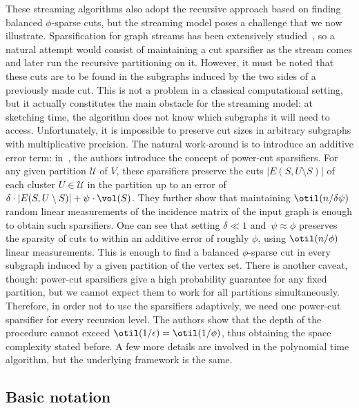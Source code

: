 These streaming algorithms also adopt the recursive approach based on finding balanced $\phi$-sparse cuts, but the streaming model poses a challenge that we now illustrate. Sparsification for graph streams has been extensively studied~\cite{ahnguha,linmeas,sparsdynamicstreams,focsspars,spectralspars}, so a natural attempt would consist of maintaining a cut sparsifier as the stream comes and later run the recursive partitioning on it. However, it must be noted that these cuts are to be found in the subgraphs induced by the two sides of a previously made cut. This is not a problem in a classical computational setting, but it actually constitutes the main obstacle for the streaming model: at sketching time, the algorithm does not know which subgraphs it will need to access. Unfortunately, it is impossible to preserve cut sizes in arbitrary subgraphs with multiplicative precision. The natural work-around is to introduce an additive error term: in~\cite{streamexpdec}, the authors introduce the concept of {power-cut} sparsifiers. For any given partition $\mathcal{U}$ of $V$, these sparsifiers preserve the cuts $|E(S,U\setminus S)|$ of each cluster $U \in \mathcal{U}$ in the partition up to an error of $\delta \cdot |E(S,U\setminus S)| + \psi \cdot \vol(S)$. They further show that maintaining $\otil(n / \delta \psi)$ random linear measurements of the incidence matrix of the input graph is enough to obtain such sparsifiers. One can see that setting $\delta \ll 1$ and~$\psi \approx \phi$ preserves the sparsity of cuts to within an additive error of roughly $\phi$, using $\otil(n/\phi)$ linear measurements. This is enough to find a balanced $\phi$-sparse cut in every subgraph induced by a given partition of the vertex set. There is another caveat, though: power-cut sparsifiers give a high probability guarantee for any fixed partition, but we cannot expect them to work for all partitions simultaneously. Therefore, in order not to use the sparsifiers adaptively, we need one power-cut sparsifier for every recursion level. The authors show that the depth of the procedure cannot exceed $\otil(1/\epsilon) = \otil(1/\phi)$, thus obtaining the space complexity stated before. A few more details are involved in the polynomial time algorithm, but the underlying framework is the same.



\subsection{Basic notation}
\label{subsec:basic}


